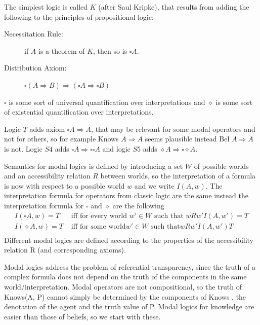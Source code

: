 The simplest logic is called $K$ (after Saul Kripke), that results from adding the
following to the principles of propositional logic:
\begin{description}
    \item [Necessitation Rule:] if $A$ is a theorem of $K$, then so is $\square A$.
    \item [Distribution Axiom: ] $\square (A \Rightarrow B) \Rightarrow 
	                          (\square A \Rightarrow \square B)$
\end{description}
$\square$ is some sort of universal quantification over interpretations and 
$\diamond$ is some sort of existential quantification over interpretations.

Logic $T$ adds axiom $\square A \Rightarrow A$, that may be relevant for some
modal operators and not for others, so for example Knows $A \Rightarrow A$ seems plausible
instead Bel $A \Rightarrow A$ is not.\newline
Logic $S4$ adds $\square A \Rightarrow \square \square A$ and logic $S5$ adds
$\diamond A \Rightarrow \square \diamond A$.

Semantics for modal logics is defined by introducing a set $W$ of possible worlds
and an accessibility relation $R$ between worlds, so the interpretation of a formula
is now with respect to a possible world $w$ and we write $I(A, w)$.\newline
The interpretation formula for operators from classic logic are the same instead 
the interpretation formula for $\square$ and $\diamond$ are the following
\begin{align*}
    I(\square A, w) = T & \text{ iff for every world } w' \in W \text{ such that } wRw'
                          I(A, w') = T \\
    I(\diamond A, w) = T & \text{ iff for some world} w' \in W \text{ such that} 
	                        wRw' I(A, w') T \\
\end{align*}
Different modal logics are defined according to the properties of the accessibility
relation R (and corresponding axioms).

Modal logics address the problem of referential transparency, since the truth of a
complex formula does not depend on the truth of the components in the same
world/interpretation.\newline
Modal operators are not compositional, so the truth of Knows(A, P) cannot simply be
determined by the components of Knows , the denotation of the agent 
and the truth value of P.\newline
Modal logics for knowledge are easier than those of beliefs, so we start with these.

